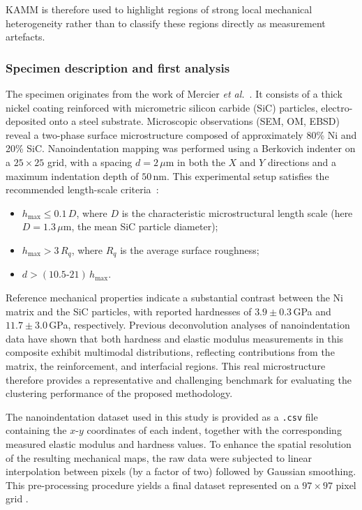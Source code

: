 \documentclass[final,3p,times]{elsarticle}
\begin{document}
KAMM is therefore used to highlight regions of strong local mechanical heterogeneity rather than to classify these regions directly as measurement artefacts.
\subsubsection{Specimen description and first analysis}
\label{sec:nisic}

The specimen originates from the work of Mercier \textit{et al.}~\cite{mercier_microstructural_2019}. 
It consists of a thick nickel coating reinforced with micrometric silicon carbide (SiC) particles, electro-deposited onto a steel substrate. Microscopic observations (SEM, OM, EBSD) reveal a two-phase surface microstructure composed of approximately 80\% Ni and 20\% SiC. Nanoindentation mapping was performed using a Berkovich indenter on a \(25 \times 25\) grid, with a spacing \(d = 2\,\mu\text{m}\) in both the \(X\) and \(Y\) directions and a maximum indentation depth of \(50\,\text{nm}\). This experimental setup satisfies the recommended length-scale criteria~\cite{randall_nanoindentation_2009, mercier_tridimap_2018}:

\begin{itemize}
    \item \(h_{\max} \leq 0.1\,D\), where \(D\) is the characteristic microstructural length scale  
    (here \(D = 1.3\,\mu\text{m}\), the mean SiC particle diameter);
    \item \(h_{\max} > 3\,R_q\), where \(R_q\) is the average surface roughness;
    \item \(d > (10.5\text{-}21)\,h_{\max}\).
\end{itemize}

Reference mechanical properties indicate a substantial contrast between the Ni matrix and the SiC particles, with reported hardnesses of \(3.9 \pm 0.3\)\,GPa and \(11.7 \pm 3.0\)\,GPa, respectively. Previous deconvolution analyses of nanoindentation data have shown that both hardness and elastic modulus measurements in this composite exhibit multimodal distributions, reflecting contributions from the matrix, the reinforcement, and interfacial regions. This real microstructure therefore provides a representative and challenging benchmark for evaluating the clustering performance of the proposed methodology.

The nanoindentation dataset used in this study is provided as a \texttt{.csv} file containing the \(x\)-\(y\) coordinates of each indent, together with the corresponding measured elastic modulus and hardness values. To enhance the spatial resolution of the resulting mechanical maps, the raw data were subjected to linear interpolation between pixels (by a factor of two) followed by Gaussian smoothing. This pre-processing procedure yields a final dataset represented on a \(97 \times 97\) pixel grid \cite{mercier_tridimap_2018, rossi_revealing_2025}.
\end{document}
